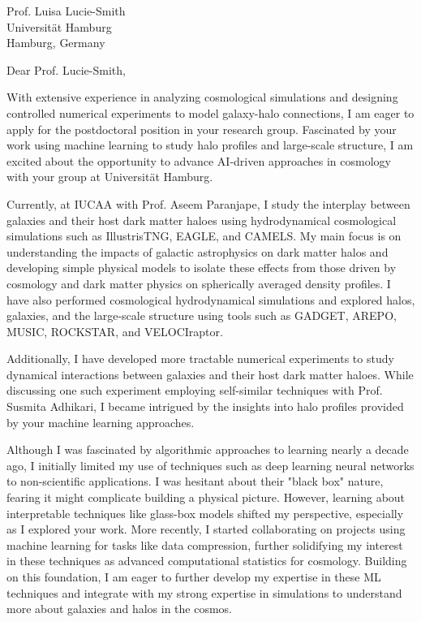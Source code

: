 \documentclass[11pt]{letter}
\begin{document}
\begin{letter}{Prof. Luisa Lucie-Smith \\ Universität Hamburg \\ Hamburg, Germany}

\opening{Dear Prof. Lucie-Smith,}

With extensive experience in analyzing cosmological simulations and designing controlled numerical experiments to model galaxy-halo connections, I am eager to apply for the postdoctoral position in your research group. Fascinated by your work using machine learning to study halo profiles and large-scale structure, I am excited about the opportunity to advance AI-driven approaches in cosmology with your group at Universität Hamburg.

Currently, at IUCAA with Prof. Aseem Paranjape, I study the interplay between galaxies and their host dark matter haloes using hydrodynamical cosmological simulations such as IllustrisTNG, EAGLE, and CAMELS. My main focus is on understanding the impacts of galactic astrophysics on dark matter halos and developing simple physical models to isolate these effects from those driven by cosmology and dark matter physics on spherically averaged density profiles. I have also performed cosmological hydrodynamical simulations and explored halos, galaxies, and the large-scale structure using tools such as GADGET, AREPO, MUSIC, ROCKSTAR, and VELOCIraptor.

Additionally, I have developed more tractable numerical experiments to study dynamical interactions between galaxies and their host dark matter haloes. While discussing one such experiment employing self-similar techniques with Prof. Susmita Adhikari, I became intrigued by the insights into halo profiles provided by your machine learning approaches.

Although I was fascinated by algorithmic approaches to learning nearly a decade ago, I initially limited my use of techniques such as deep learning neural networks to non-scientific applications. I was hesitant about their "black box" nature, fearing it might complicate building a physical picture. However, learning about interpretable techniques like glass-box models shifted my perspective, especially as I explored your work. More recently, I started collaborating on projects using machine learning for tasks like data compression, further solidifying my interest in these techniques as advanced computational statistics for cosmology. Building on this foundation, I am eager to further develop my expertise in these ML techniques and integrate with my strong expertise in simulations to understand more about galaxies and halos in the cosmos.


\end{letter}
\end{document}
